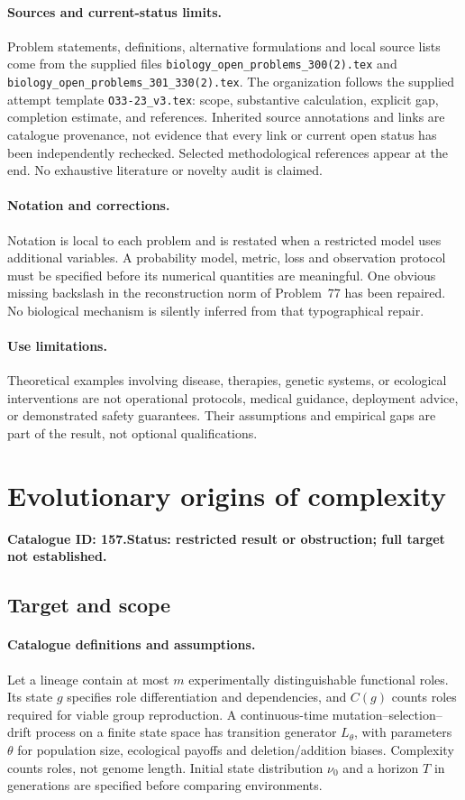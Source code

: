 \documentclass[11pt]{article}
\begin{document}
\paragraph{Sources and current-status limits.}
Problem statements, definitions, alternative formulations and local source lists
come from the supplied files
\texttt{biology\_open\_problems\_300(2).tex} and
\texttt{biology\_open\_problems\_301\_330(2).tex}.
The organization follows the supplied attempt template
\texttt{O33-23\_v3.tex}: scope, substantive calculation, explicit gap,
completion estimate, and references. Inherited source annotations and links are
catalogue provenance, not evidence that every link or current open status has
been independently rechecked. Selected methodological references appear at the
end. No exhaustive literature or novelty audit is claimed.

\paragraph{Notation and corrections.}
Notation is local to each problem and is restated when a restricted model uses
additional variables. A probability model, metric, loss and observation protocol
must be specified before its numerical quantities are meaningful. One obvious
missing backslash in the reconstruction norm of Problem~77 has been repaired.
No biological mechanism is silently inferred from that typographical repair.

\paragraph{Use limitations.}
Theoretical examples involving disease, therapies, genetic systems, or ecological
interventions are not operational protocols, medical guidance, deployment advice,
or demonstrated safety guarantees. Their assumptions and empirical gaps are part
of the result, not optional qualifications.

\setcounter{section}{156}
\section{Evolutionary origins of complexity}
\label{prob:157}
\noindent\textbf{Catalogue ID: 157.}\quad \textbf{Status: restricted result or obstruction; full target not established.}
\subsection{Target and scope}
\paragraph{Catalogue definitions and assumptions.}
Let a lineage contain at most $m$ experimentally distinguishable functional roles. Its state $g$ specifies role differentiation and dependencies, and $C(g)$ counts roles required for viable group reproduction. A continuous-time mutation--selection--drift process on a finite state space has transition generator $L_\theta$, with parameters $\theta$ for population size, ecological payoffs and deletion/addition biases. Complexity counts roles, not genome length. Initial state distribution $\nu_0$ and a horizon $T$ in generations are specified before comparing environments.
\end{document}
